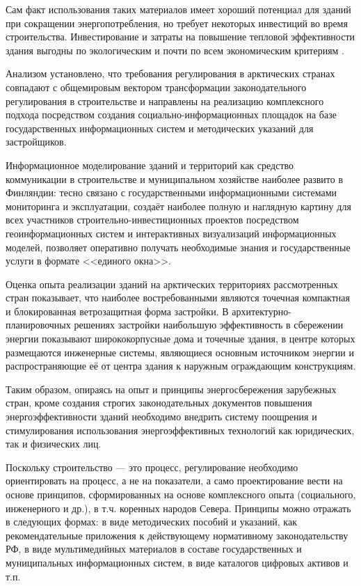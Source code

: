 Сам факт использования таких материалов имеет хороший потенциал для зданий при сокращении энергопотребления, но требует некоторых инвестиций во время строительства.
Инвестирование и затраты на повышение тепловой эффективности здания выгодны по экологическим и почти по всем экономическим критериям \cite{2017buee_ADAMCZYK_421}.


Анализом установлено, что требования регулирования в арктических странах совпадают с общемировым вектором трансформации законодательного регулирования в строительстве
и направлены на реализацию комплексного подхода посредством создания социально-информационных площадок на базе государственных информационных систем
и методических указаний для застройщиков.

Информационное моделирование зданий и территорий как средство коммуникации в строительстве и муниципальном хозяйстве наиболее развито в Финляндии: тесно связано с государственными информационными системами мониторинга
и эксплуатации, создаёт наиболее полную и наглядную картину для всех участников строительно-инвестиционных проектов посредством геоинформационных систем и интерактивных визуализаций информационных моделей,
позволяет оперативно получать необходимые знания и государственные услуги в формате <<единого окна>>.

Оценка опыта реализации зданий на арктических территориях рассмотренных стран показывает, что наиболее востребованными являются точечная компактная и блокированная ветрозащитная форма
застройки. В архитектурно-планировочных решениях застройки наибольшую эффективность в сбережении энергии показывают ширококорпусные дома
и точечные здания, в центре которых размещаются инженерные системы, являющиеся основным источником энергии и распространяющие её от центра здания
к наружным ограждающим конструкциям.

Таким образом, опираясь на опыт и принципы энергосбережения зарубежных стран, кроме создания строгих законодательных документов повышения энергоэффективности зданий
необходимо внедрить систему поощрения и стимулирования использования энергоэффективных технологий как юридических, так и физических лиц.

Поскольку строительство --- это процесс, регулирование необходимо ориентировать на процесс, а не на показатели, а само проектирование вести на основе принципов,
сформированных на основе комплексного опыта (социального, инженерного и др.), в т.ч. коренных народов Севера.
Принципы можно отражать в следующих формах: в виде методических пособий и указаний, как рекомендательные приложения к действующему нормативному законодательству РФ,
в виде мультимедийных материалов в составе государственных и муниципальных информационных систем, в виде каталогов цифровых активов и т.п.

